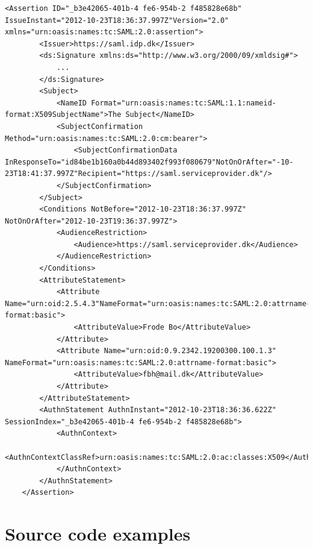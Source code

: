\documentclass[twosided]{report}
\begin{document}
\begin{lstlisting}[style=cxml, caption={[Sample SAML Assertion]Sample SAML Assertion \cite{jacob}.}]
	<Assertion ID="_b3e42065-401b-4 fe6-954b-2 f485828e68b" IssueInstant="2012-10-23T18:36:37.997Z"Version="2.0" xmlns="urn:oasis:names:tc:SAML:2.0:assertion">
		<Issuer>https://saml.idp.dk</Issuer>
		<ds:Signature xmlns:ds="http://www.w3.org/2000/09/xmldsig#">
			...
		</ds:Signature>
		<Subject>
			<NameID Format="urn:oasis:names:tc:SAML:1.1:nameid-format:X509SubjectName">The Subject</NameID>
			<SubjectConfirmation Method="urn:oasis:names:tc:SAML:2.0:cm:bearer">
				<SubjectConfirmationData InResponseTo="id84be1b160a0b44d893402f993f080679"NotOnOrAfter="-10-23T18:41:37.997Z"Recipient="https://saml.serviceprovider.dk"/>
			</SubjectConfirmation>
		</Subject>
		<Conditions NotBefore="2012-10-23T18:36:37.997Z" NotOnOrAfter="2012-10-23T19:36:37.997Z">
			<AudienceRestriction>
				<Audience>https://saml.serviceprovider.dk</Audience>
			</AudienceRestriction>
		</Conditions>
		<AttributeStatement>
			<Attribute Name="urn:oid:2.5.4.3"NameFormat="urn:oasis:names:tc:SAML:2.0:attrname-format:basic">
				<AttributeValue>Frode Bo</AttributeValue>
			</Attribute>
			<Attribute Name="urn:oid:0.9.2342.19200300.100.1.3" NameFormat="urn:oasis:names:tc:SAML:2.0:attrname-format:basic">
				<AttributeValue>fbh@mail.dk</AttributeValue>
			</Attribute>
		</AttributeStatement>
		<AuthnStatement AuthnInstant="2012-10-23T18:36:36.622Z" SessionIndex="_b3e42065-401b-4 fe6-954b-2 f485828e68b">
			<AuthnContext>
				<AuthnContextClassRef>urn:oasis:names:tc:SAML:2.0:ac:classes:X509</AuthnContextClassRef>
			</AuthnContext>
		</AuthnStatement>
	</Assertion>
\end{lstlisting}

\chapter{Source code examples}
\label{chap:jacobcode}
\end{document}
